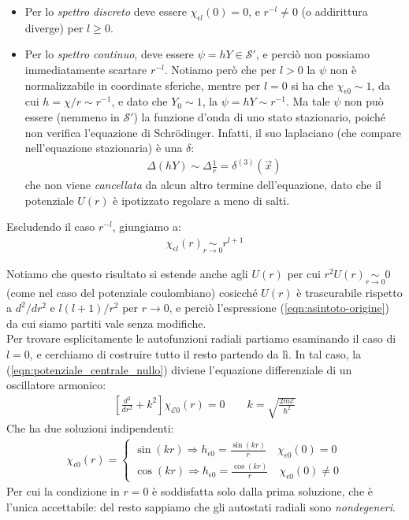 \documentclass[../../FisicaTeorica.tex]{subfiles}
\begin{document}
\begin{itemize}
\item Per lo \textit{spettro discreto} deve essere $\chi_{\epsilon l}(0) = 0$, e $r^{-l} \neq 0$ (o addirittura diverge) per $l\geq 0$.
\item Per lo \textit{spettro continuo}, deve essere $\psi=hY \in \mathcal{S}'$, e perciò non possiamo immediatamente scartare $r^{-l}$. Notiamo però che per $l>0$ la $\psi$ non è normalizzabile in coordinate sferiche, mentre per $l=0$ si ha che $\chi_{\epsilon 0}\sim1$, da cui $h=\chi/r \sim r^{-1}$, e dato che $Y_0 \sim 1$, la $\psi = hY \sim r^{-1}$. Ma tale $\psi$ non può essere (nemmeno in $\mathcal{S}'$) la funzione d'onda di uno stato stazionario, poiché non verifica l'equazione di Schr\"odinger. Infatti, il suo laplaciano (che compare nell'equazione stazionaria) è una $\delta$:
\begin{align*}
\Delta(hY)\sim \Delta \frac{1}{r} = \delta^{(3)}(\vec{x})
\end{align*}
che non viene \textit{cancellata} da alcun altro termine dell'equazione, dato che il potenziale $U(r)$ è ipotizzato regolare a meno di salti.
\end{itemize}
Escludendo il caso $r^{-l}$, giungiamo a:
\begin{align*}
\chi_{\epsilon l} (r) \underset{r \to 0}{\sim} r^{l+1}
\end{align*}

Notiamo che questo risultato si estende anche agli $U(r)$ per cui $r^2 U(r) \underset{r\to 0}{\sim} 0$ (come nel caso del potenziale coulombiano) cosicché $U(r)$ è trascurabile rispetto a $d^2/dr^2$ e $l(l+1)/r^2$ per $r\to 0$, e perciò l'espressione (\ref{eqn:asintoto-origine}) da cui siamo partiti vale senza modifiche.\\

Per trovare esplicitamente le autofunzioni radiali partiamo esaminando il caso di $l=0$, e cerchiamo di costruire tutto il resto partendo da lì. In tal caso, la (\ref{eqn:potenziale_centrale_nullo})
diviene l'equazione differenziale di un oscillatore armonico:
\begin{align}
\left[\frac{d^2}{dr^2} + k^2 \right] \chi_{\mathcal{E}0} (r) = 0 \qquad k = \sqrt{\frac{2m\mathcal{E}}{\hbar^2}}
\label{eqn:pot-centrale-nullo-differenziale}
\end{align}
Che ha due soluzioni indipendenti:
\begin{align*}
\chi_{\epsilon 0}(r)=
\begin{cases}
\sin(k r) \Rightarrow  h_{\epsilon 0}=\frac{\sin(kr)}{r} \quad \chi_{\epsilon 0}(0) = 0\\
\cos(kr)  \Rightarrow  h_{\epsilon 0} = \frac{\cos(kr)}{r} \quad \chi_{\epsilon 0}(0) \neq 0
\end{cases}
\end{align*}
Per cui la condizione in $r=0$ è soddisfatta solo dalla prima soluzione, che è l'unica accettabile: del resto sappiamo che gli autostati radiali sono \textit{nondegeneri}.\\
\end{document}
